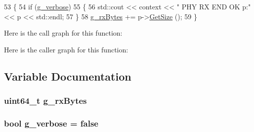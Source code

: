 \begin{DoxyCode}
53 \{
54   \textcolor{keywordflow}{if} (\hyperlink{adhoc-aloha-ideal-phy-matrix-propagation-loss-model_8cc_a817b47f52eeb5f98e32ce7d19a86aa7e}{g\_verbose})
55     \{
56       std::cout << context << \textcolor{stringliteral}{" PHY RX END OK p:"} << p << std::endl;
57     \}
58   \hyperlink{adhoc-aloha-ideal-phy-matrix-propagation-loss-model_8cc_af09b60ca0cfec21bd5d0aff8f44eb19c}{g\_rxBytes} += p->\hyperlink{classns3_1_1Packet_a462855c9929954d4301a4edfe55f4f1c}{GetSize} ();
59 \}
\end{DoxyCode}


Here is the call graph for this function\+:




Here is the caller graph for this function\+:




\subsection{Variable Documentation}
\subsubsection[{\texorpdfstring{g\+\_\+rx\+Bytes}{g_rxBytes}}]{\setlength{\rightskip}{0pt plus 5cm}uint64\+\_\+t g\+\_\+rx\+Bytes\hspace{0.3cm}{\ttfamily [static]}}\hypertarget{adhoc-aloha-ideal-phy-matrix-propagation-loss-model_8cc_af09b60ca0cfec21bd5d0aff8f44eb19c}{}\label{adhoc-aloha-ideal-phy-matrix-propagation-loss-model_8cc_af09b60ca0cfec21bd5d0aff8f44eb19c}
\subsubsection[{\texorpdfstring{g\+\_\+verbose}{g_verbose}}]{\setlength{\rightskip}{0pt plus 5cm}bool g\+\_\+verbose = {\bf false}\hspace{0.3cm}{\ttfamily [static]}}\hypertarget{adhoc-aloha-ideal-phy-matrix-propagation-loss-model_8cc_a817b47f52eeb5f98e32ce7d19a86aa7e}{}\label{adhoc-aloha-ideal-phy-matrix-propagation-loss-model_8cc_a817b47f52eeb5f98e32ce7d19a86aa7e}
